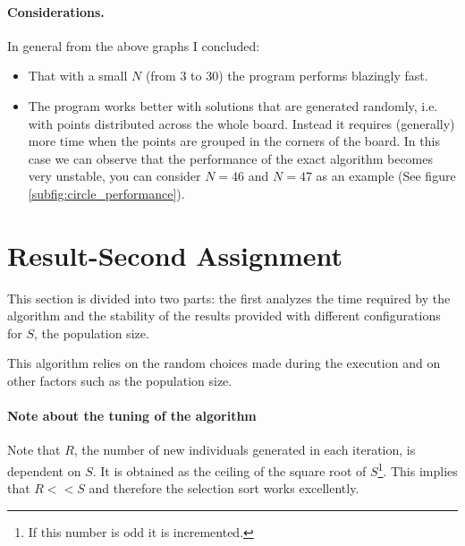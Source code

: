 \paragraph{Considerations.}
In general from the above graphs I concluded:
\begin{itemize}
	\item That with a small $N$ (from 3 to 30) the program performs blazingly fast.
	\item The program works better with solutions that are generated randomly, i.e. with points distributed 
	across the whole board. Instead it requires (generally) more time when the points are grouped
	in the corners of the board. In this case 
	we can observe that the performance of the exact algorithm becomes very unstable, you can consider $N = 46$ and $N=47$ as an example
	(See figure \ref{subfig:circle_performance}).
	
\end{itemize}
\newpage


\section{Result-Second Assignment}
\label{sec:II:performance}
This section is divided into two
parts: the first analyzes the time required by the algorithm 
and the stability of the results provided with different configurations for
$S$, the population size.


This algorithm relies on the random choices made during the execution and on other factors such as the population size.

\paragraph{Note about the tuning of the algorithm} Note that $R$, the number of new individuals generated in each iteration, is dependent on $S$. It is obtained
as the ceiling of the square root of $S$\footnote{If this number is odd it is incremented.}. This implies that $R << S$ and therefore the selection sort works excellently.

